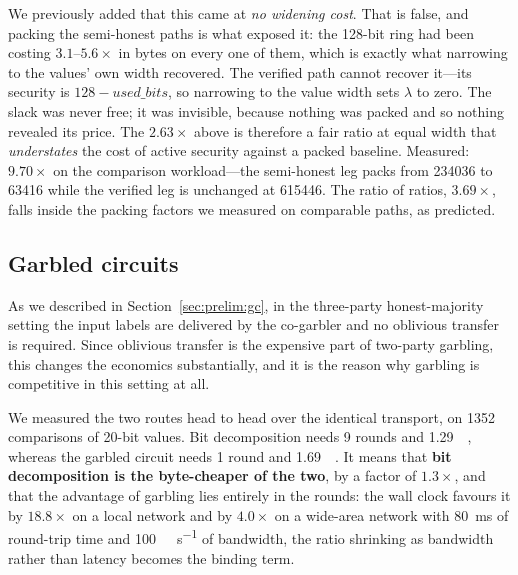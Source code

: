\documentclass[11pt]{article}
\begin{document}
We previously added that this came at \emph{no widening cost}. That is false, and
packing the semi-honest paths is what exposed it: the 128-bit ring had been costing
$3.1$--$5.6\times$ in bytes on every one of them, which is exactly what narrowing to
the values' own width recovered. The verified path cannot recover it---its security is
$128 - \mathit{used\_bits}$, so narrowing to the value width sets $\lambda$ to zero.
The slack was never free; it was invisible, because nothing was packed and so nothing
revealed its price. The $2.63\times$ above is therefore a fair ratio at equal width
that \emph{understates} the cost of active security against a packed baseline. Measured:
\textbf{$9.70\times$} on the comparison workload---the semi-honest leg packs from
\num{234036} to \SI{63416}{\byte} while the verified leg is unchanged at
\num{615446}. The ratio of ratios, $3.69\times$, falls inside the packing factors we
measured on comparable paths, as predicted.

\subsection{Garbled circuits}
\label{sec:gc}

As we described in Section~\ref{sec:prelim:gc}, in the three-party honest-majority
setting the input labels are delivered by the co-garbler and no oblivious transfer is
required. Since oblivious transfer is the expensive part of two-party garbling, this changes
the economics substantially, and it is the reason why garbling is competitive in this setting
at all.

We measured the two routes head to head over the identical transport, on \num{1352}
comparisons of 20-bit values. Bit decomposition needs 9 rounds and \SI{1.29}{\mega\byte},
whereas the garbled circuit needs 1 round and \SI{1.69}{\mega\byte}. It means that
\textbf{bit decomposition is the byte-cheaper of the two}, by a factor of $1.3\times$, and
that the advantage of garbling lies entirely in the rounds: the wall clock favours it by
$18.8\times$ on a local network and by $4.0\times$ on a wide-area network with
\SI{80}{\milli\second} of round-trip time and \SI{100}{\mega\bit\per\second} of bandwidth,
the ratio shrinking as bandwidth rather than latency becomes the binding term.
\end{document}
